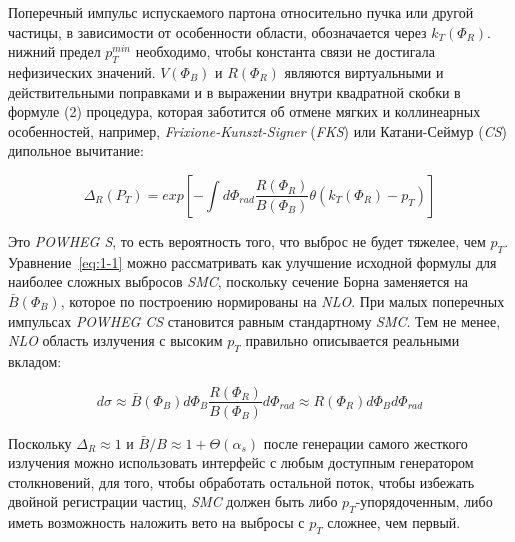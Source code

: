 Поперечный импульс испускаемого партона относительно
пучка или другой частицы, в зависимости от особенности области, обозначается через ${k}_{T}({\Phi}_{R})$.
нижний предел ${p}_{T}^{min}$
необходимо, чтобы константа связи не достигала нефизических значений.
$V({\Phi}_{B})$ и $R({\Phi}_{R})$ являются виртуальными и действительными поправками и в выражении внутри
квадратной скобки в формуле (2) процедура, которая заботится об отмене мягких и коллинеарных
особенностей, например, \textit{Frixione-Kunszt-Signer} (\textit{FKS}) или Катани-Сеймур (\textit{CS})
дипольное вычитание:

\begin{equation} \label{eq:1-2}  
	{\Delta}_{R}({P}_{T}) = exp[-\int d{\Phi}_{rad}\frac{R({\Phi}_{R})}{B({\Phi}_{B})}\theta({k}_{T}({\Phi}_{R}) - {p}_{T})]
\end{equation}

Это \textit{POWHEG S}, то есть вероятность того, что выброс не будет тяжелее, чем ${p}_{T}$. Уравнение~\ref{eq:1-1} можно рассматривать как улучшение исходной формулы для наиболее сложных выбросов \textit{SMC}, поскольку
сечение Борна заменяется на $\bar{B}({\Phi}_{B})$, которое по построению нормированы на \textit{NLO}.
При малых поперечных импульсах \textit{POWHEG} \textit{CS} становится равным стандартному \textit{SMC}.
Тем не менее, \textit{NLO}
область излучения с высоким ${p}_{T}$ правильно описывается реальными вкладом:

\begin{equation} \label{eq:1-3}   
	d\sigma \approx \bar{B}({\Phi}_{B}) d{\Phi}_{B}\frac{R({\Phi}_{R})}{B({\Phi}_{B})}d{\Phi}_{rad}\approx R({\Phi}_{R})d{\Phi}_{B}d{\Phi}_{rad}
\end{equation}


Поскольку ${\Delta}_{R} \approx 1$ и $\bar{B}/B \approx 1 + \Theta ({\alpha}_{s})$ после генерации самого жесткого излучения можно
использовать интерфейс с любым доступным генератором столкновений, для того, чтобы обработать остальной поток,
чтобы избежать двойной регистрации частиц, \textit{SMC} должен быть либо ${p}_{T}$-упорядоченным, либо иметь возможность
наложить вето на выбросы с ${p}_{T}$ сложнее, чем первый.

